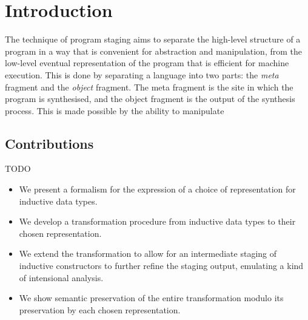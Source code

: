 \section{Introduction}\label{sec:intro}
The technique of program staging aims to separate the high-level structure of a
program in a way that is convenient for abstraction and manipulation, from the
low-level eventual representation of the program that is efficient for machine
execution. This is done by separating a language into two parts: the
\emph{meta} fragment and the \emph{object} fragment. The meta fragment is the
site in which the program is synthesised, and the object fragment is the output
of the synthesis process. This is made possible by the ability to manipulate
\subsection{Contributions}

TODO

\begin{itemize}
  \item We present a formalism for the expression of a choice of representation for
        inductive data types. 
  \item We develop a transformation procedure from inductive data types to their chosen
        representation. 
  \item We extend the transformation to allow for an intermediate staging of inductive
        constructors to further refine the staging output, emulating a kind of
        intensional analysis. 
  \item We show semantic preservation of the entire transformation modulo its
        preservation by each chosen representation. 
\end{itemize}

